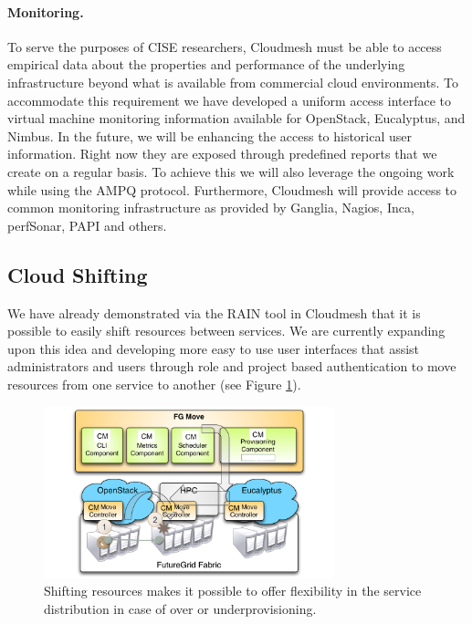 \documentclass[graybox]{svmult}
\begin{document}
\paragraph{Monitoring.}


To serve the purposes of CISE researchers, Cloudmesh must be able to access empirical data about the properties and performance of the underlying infrastructure beyond what is available from commercial cloud environments. To accommodate this requirement we have developed a uniform access interface to virtual machine monitoring information available for OpenStack, Eucalyptus, and Nimbus. In the future, we will be enhancing the access to historical user information. Right now they are exposed through predefined reports that we create on a regular basis. To achieve this we will also leverage the ongoing work while using the AMPQ protocol. Furthermore, Cloudmesh will provide access to common monitoring infrastructure as provided by Ganglia, Nagios, Inca, perfSonar, PAPI and others.




\subsection{Cloud Shifting}


We have already demonstrated via the RAIN tool in Cloudmesh that it is possible to easily shift resources between services. We are currently expanding upon this idea and developing more easy to use user interfaces that assist administrators and users through role and project based authentication to move resources from one service to another (see Figure \ref{F:shift}).


\begin{figure}[htb]
  \centering
    \includegraphics[width=0.75\textwidth]{images/shift2.pdf}
  \caption{Shifting resources makes it possible to offer flexibility
    in the service distribution in case of over or underprovisioning.}\label{F:shift}
\end{figure}
\end{document}
